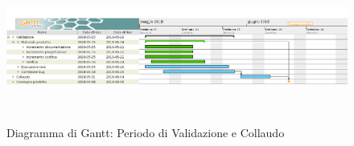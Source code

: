             \begin{figure}[H]
                \centering
                \includegraphics[width=1\linewidth, height=5cm]{./img/Gantt/Validazione.png}
                \caption[Gantt - Validazione e collaudo]{Diagramma di Gantt: Periodo di Validazione e Collaudo}
            \end{figure}

	\newpage